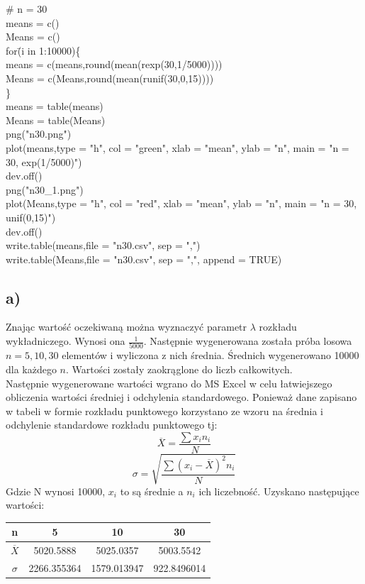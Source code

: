 \documentclass{article}
\begin{document}
{\begin{tabbing}
\# n = 30\\
means = c() \\
Means = c() \\
for\=(i in 1:10000)\{ \+ \\
	means = c(means,round(mean(rexp(30,1/5000)))) \\
	Means = c(Means,round(mean(runif(30,0,15)))) \\
\} \- \\
means = table(means) \\
Means = table(Means) \\
png("n30.png") \\
plot(means,type = "h", col = "green", xlab = "mean", ylab = "n", main = "n = 30, exp(1/5000)") \\
dev.off() \\
png("n30\_1.png") \\
plot(Means,type = "h", col = "red", xlab = "mean", ylab = "n", main = "n = 30, unif(0,15)") \\
dev.off() \\
write.table(means,file = "n30.csv", sep = ",") \\
write.table(Means,file = "n30.csv", sep = ",", append = TRUE)
\end{tabbing}
}

\subsection*{a)}
Znając wartość oczekiwaną można wyznaczyć parametr $\lambda$ rozkładu wykładniczego. Wynosi ona $\frac{1}{5000}$. Następnie wygenerowana została próba losowa $n = 5, 10, 30$ elementów i wyliczona z nich średnia. Średnich wygenerowano 10000 dla każdego $n$. Wartości zostały zaokrąglone do liczb całkowitych. \\
Następnie wygenerowane wartości wgrano do MS Excel w celu łatwiejszego obliczenia wartości średniej i odchylenia standardowego. Ponieważ dane zapisano w tabeli w formie rozkładu punktowego korzystano ze wzoru na średnia i odchylenie standardowe rozkładu punktowego tj:
\[
\overline{X} = \frac{\sum x_in_i}{N}
\] 
\[ \sigma = \sqrt{\frac{\sum(x_i - \overline{X})^2n_i}{N}} \]
Gdzie N wynosi 10000, $x_i$ to są średnie a $n_i$ ich liczebność.
Uzyskano następujące wartości: \\
\begin{center}
\begin{tabular}{|c|c|c|c|}
\hline
n & 5 & 10 & 30 \\
\hline
$\overline{X}$ & 5020.5888 & 5025.0357 & 5003.5542 \\
\hline
$\sigma$ & 2266.355364 & 1579.013947 &  922.8496014 \\
\hline
\end{tabular}
\end{center}
\end{document}
